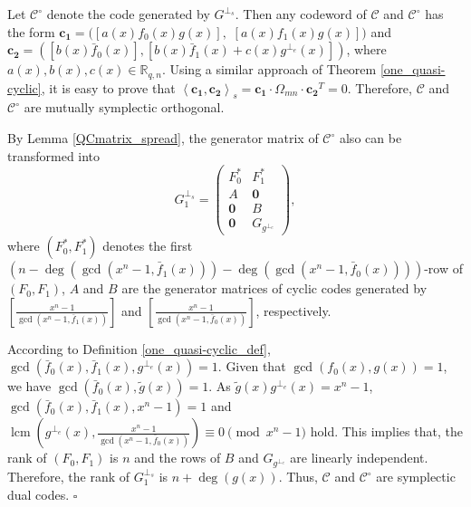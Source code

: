 \documentclass[journal]{IEEEtran}
\newenvironment{proof}{{\noindent\it Proof:} }{\hfill $\square$\par}
\begin{document}
\begin{proof}
	 Let $\mathscr{C}^{\circ}$ denote the code generated by $G^{\perp_{s}}$.  
 Then any codeword of $\mathscr{C}$ and $\mathscr{C}^{\circ}$ has the form $\mathbf{c_{1}}=(\left[a(x) f_{0}(x) g(x)\right],$ $\left[a(x) f_{1}(x) g(x)\right])$ and $\mathbf{c_{2}}=(\left[b(x) \bar{f}_{0}(x)\right],\left[b(x) \bar{f}_{1}(x)+c(x)g^{\perp_e}(x)\right])$, where $a(x),b(x),c(x)\in\mathbb{R}_{q,n}$. 
	Using a similar approach of Theorem \ref{one_quasi-cyclic}, it is easy to prove that $\left\langle \mathbf{c_{1}}, \mathbf{c_{2}}\right\rangle_{s}=\mathbf{c_{1}} \cdot \Omega _{mn} \cdot \mathbf{c_{2}}^{T}=0$.
	Therefore, $\mathscr{C}$ and $\mathscr{C}^{\circ}$ are mutually symplectic orthogonal.


 		By Lemma \ref{QCmatrix_spread}, the generator matrix of $\mathscr{C}^{\circ}$ also can be transformed into 
\begin{equation}
	G_1^{\perp_{s}}=
	\begin{pmatrix}
		F_{0}^{*}	& F_{1}^{*}\\
		A	& \mathbf{0}\\
		\mathbf{0}	& B\\
		\mathbf{0}&G_{g^{\perp_e}}
	\end{pmatrix},
\end{equation}
 		where $(F_{0}^{*},F_1^{*})$ denotes the first $(n-\deg(\gcd(x^n-1,\bar{f}_1(x)))-\deg(\gcd(x^n-1,\bar{f}_{0}(x))))$-row of $(F_{0},F_1)$, $A$ and $B$ are the generator matrices of cyclic codes generated by $\left[  \frac{x^n-1}{\gcd(x^n-1,\bar{f}_{1}(x))}\right]$ and $\left[ \frac{x^n-1}{\gcd(x^n-1,\bar{f}_{0}(x))}\right]$, respectively.
 		
 		According to Definition \ref{one_quasi-cyclic_def}, $\gcd(\bar{f}_{0}(x),\bar{f}_{1}(x),g^{\perp_e}(x))=1$. Given that $\gcd(f_0(x),g(x))=1$, we have $\gcd(\bar{f}_0(x),\tilde{g}(x) )=1$. As $\tilde{g}(x)g^{\perp_e}(x)=x^n-1$,  $\gcd(\bar{f}_{0}(x),\bar{f}_{1}(x),x^n-1)=1$ and $\operatorname{lcm}\left(g^{\perp_e}(x),\frac{x^n-1}{\gcd(x^n-1,\bar{f}_{0}(x))}\right) \equiv 0 \pmod{x^n-1}$ hold. This implies that, the rank of $(F_{0}, F_{1})$ is $n$ and the rows of $B$ and $G_{g^{\perp_e}}$ are linearly independent. Therefore, the rank of $G_1^{\perp_{s}}$ is $n+\deg(g(x))$. Thus, $\mathscr{C}$ and $\mathscr{C}^{\circ}$ are symplectic dual codes.
\end{proof}
\end{document}
